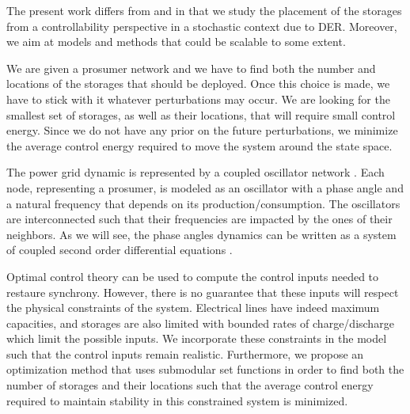 \documentclass[conference]{IEEEtran}
\begin{document}
The present work differs from \cite{Gkatzikis2015} and \cite{Farraj2015} in that we study the placement of the storages from a controllability perspective in a stochastic context due to DER. Moreover, we aim at models and methods that could be scalable to some extent.  

We are given a prosumer network and we have to find both the number and locations of the storages that should be deployed. Once this choice is made, we have to stick with it whatever perturbations may occur. We are looking for the smallest set of storages, as well as their locations, that will require small control energy. Since we do not have any prior on the future perturbations, we minimize the average control energy required to move the system around the state space.






The power grid dynamic is represented by a coupled oscillator network \cite{Filatrella2008}. Each node, representing a prosumer, is modeled as an oscillator with a phase angle and a natural frequency that depends on its production/consumption. The oscillators are interconnected such that their frequencies are impacted by the ones of their neighbors. As we will see, the phase angles dynamics can be written as a system of coupled second order differential equations \cite{Filatrella2008}.

Optimal control theory can be used to compute the control inputs needed to restaure synchrony. However, there is no guarantee that these inputs will respect the physical constraints of the system. Electrical lines have indeed maximum capacities, and storages are also limited with bounded rates of charge/discharge which limit the possible inputs. We incorporate these constraints in the model such that the control inputs remain realistic. Furthermore, we propose an optimization method that uses submodular set functions in order to find both the number of storages and their locations such that the average control energy required to maintain stability in this constrained system is minimized.
\end{document}
